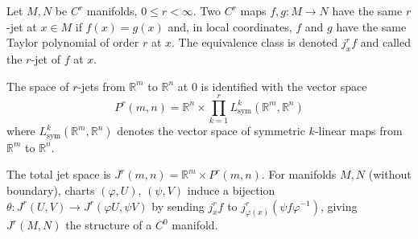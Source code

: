Let $M, N$ be $C^r$ manifolds, $0 \leqslant r < \infty$. Two $C^r$ maps $f, g: M \to N$ have the same $r$-jet at $x \in M$ if $f(x) = g(x)$ and, in local coordinates, $f$ and $g$ have the same Taylor polynomial of order $r$ at $x$. The equivalence class is denoted $j^r_x f$ and called the $r$-jet of $f$ at $x$.

The space of $r$-jets from $\mathbb{R}^m$ to $\mathbb{R}^n$ at $0$ is identified with the vector space
$$P^r(m,n) = \mathbb{R}^n \times \prod_{k=1}^{r} L_{\text{sym}}^k(\mathbb{R}^m,\mathbb{R}^n)$$
where $L_{\text{sym}}^k(\mathbb{R}^m,\mathbb{R}^n)$ denotes the vector space of symmetric $k$-linear maps from $\mathbb{R}^m$ to $\mathbb{R}^n$.

The total jet space is $J^r(m,n) = \mathbb{R}^m \times P^r(m,n)$. For manifolds $M, N$ (without boundary), charts $(\varphi,U)$, $(\psi,V)$ induce a bijection $\theta: J^r(U,V) \to J^r(\varphi U,\psi V)$ by sending $j^r_x f$ to $j^r_{\varphi(x)}(\psi f \varphi^{-1})$, giving $J^r(M,N)$ the structure of a $C^0$ manifold.
